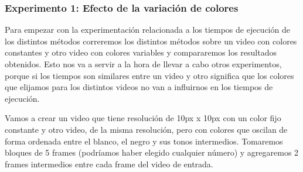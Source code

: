\subsubsection{Experimento 1: Efecto de la variaci\'on de colores}
\par Para empezar con la experimentaci\'on relacionada a los tiempos de ejecuci\'on de los distintos m\'etodos correremos los distintos m\'etodos sobre un video con colores constantes y otro video con colores variables y compararemos los resultados obtenidos. Esto nos va a servir a la hora de llevar a cabo otros experimentos, porque si los tiempos son similares entre un video y otro significa que los colores que elijamos para los distintos videos no van a influirnos en los tiempos de ejecuci\'on.

\par Vamos a crear un video que tiene resoluci\'on de 10px x 10px con un color fijo constante y otro video, de la misma resoluci\'on, pero con colores que oscilan de forma ordenada entre el blanco, el negro y sus tonos intermedios. Tomaremos bloques de 5 frames (podr\'iamos haber elegido cualquier n\'umero) y agregaremos 2 frames intermedios entre cada frame del video de entrada.



\begin{figure}[ht]
	\begin{center}
	\end{center}
\end{figure}


